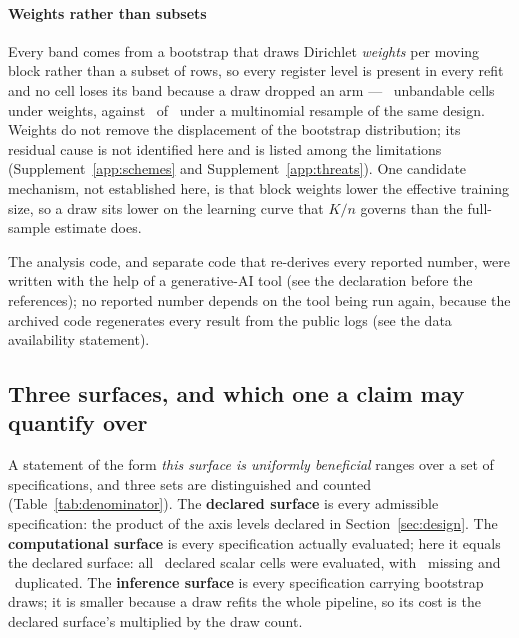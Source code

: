 \documentclass[11pt,3p,review,authoryear]{elsarticle}
\theoremstyle{definition}
\begin{document}
\paragraph{Weights rather than subsets}
Every band comes from a bootstrap that draws Dirichlet \emph{weights} per
moving block rather than a subset of rows, so every register level is present
in every refit and no cell loses its band because a draw dropped an arm ---
\nUnbandableCells\ unbandable cells under weights, against
\nUnbandableSameDesign\ of \nUnbandableSameDesignOf\ under a multinomial
resample of the same design. Weights do not remove the displacement of the
bootstrap distribution; its residual cause is not identified here and is
listed among the limitations (Supplement~\ref{app:schemes} and
Supplement~\ref{app:threats}). One candidate mechanism, not established
here, is that block weights lower the effective training size, so a draw sits
lower on the learning curve that $K/n$ governs than the full-sample estimate
does.

The analysis code, and separate code that re-derives every reported number,
were written with the help of a generative-AI tool (see the declaration
before the references); no reported number depends on the tool being run
again, because the archived code regenerates every result from the public
logs (see the data availability statement).

\subsection{Three surfaces, and which one a claim may quantify over}
\label{sec:threesurfaces}

A statement of the form \emph{this surface is uniformly beneficial} ranges
over a set of specifications, and three sets are distinguished and counted
(Table~\ref{tab:denominator}). The \textbf{declared surface} is every
admissible specification: the product of the axis levels declared in
Section~\ref{sec:design}. The \textbf{computational surface} is every
specification actually evaluated; here it equals the declared surface: all
\nDeclaredAdmissibleScalar\ declared scalar cells were evaluated, with
\nMissingCells\ missing and \nDuplicateCells\ duplicated. The
\textbf{inference surface} is every specification carrying bootstrap draws;
it is smaller because a draw refits the whole pipeline, so its cost is the
declared surface's multiplied by the draw count.
\end{document}
